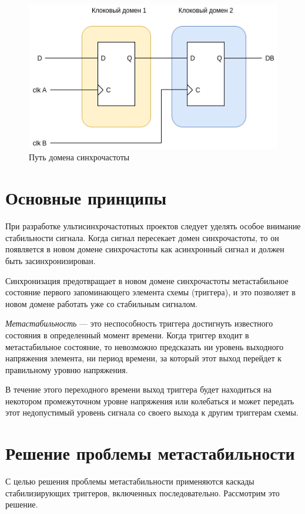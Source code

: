 \begin{figure}
	\centering
	\includegraphics[width=0.7\linewidth]{course-scheme/images/multiclock-domain}
	\caption{Путь домена синхрочастоты}
	\label{fig:multiclock-domain}
\end{figure}


\section{Основные принципы}

При разработке ультисинхрочастотных проектов следует уделять особое внимание стабильности сигнала. Когда сигнал пересекает домен синхрочастоты, то он появляется в новом домене синхрочастоты как асинхронный сигнал и должен быть засинхронизирован.

Синхронизация предотвращает в новом домене синхрочастоты метастабильное состояние первого запоминающего элемента схемы (триггера), и это позволяет в новом домене работать уже со стабильным сигналом.

\textit{Метастабильность} --- это неспособность триггера достигнуть известного состояния в определенный момент времени. Когда триггер входит в метастабильное состояние, то невозможно предсказать ни уровень выходного напряжения элемента, ни период времени, за который этот выход перейдет к правильному уровню напряжения. 

В течение этого переходного времени выход триггера будет находиться на некотором промежуточном уровне напряжения или колебаться и может передать этот недопустимый уровень сигнала со своего выхода к другим триггерам схемы.

\section{Решение проблемы метастабильности}

С целью решения проблемы метастабильности применяются каскады стабилизирующих триггеров, включенных последовательно. Рассмотрим это решение.



